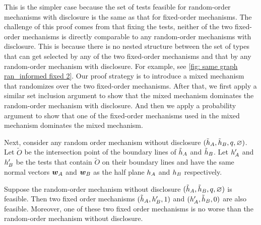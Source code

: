 This is the simpler case because the set of tests feasible for random-order mechanisms with disclosure is the same as that for fixed-order mechanisms.
The challenge of this proof comes from that fixing the tests, neither of the two fixed-order mechanisms is directly comparable to any random-order mechanisms with disclosure.
This is because there is no nested structure between the set of types that can get selected by any of the two fixed-order mechanisms and that by any random-order mechanism with disclosure.
For example, see \cref{fig: same graph ran_informed fixed 2}. 
Our proof strategy is to introduce a mixed mechanism that randomizes over the two fixed-order mechanisms.
After that, we first apply a similar set inclusion argument to show that the mixed  mechanism dominates the random-order mechanism with disclosure.
And then we apply a probability argument to show that one of the fixed-order mechanisms used in the mixed mechanism dominates the mixed mechanism.





Next, consider any random order mechanism without disclosure $(\tilde {h}_A,\tilde {h}_B, q, \varnothing)$. 
Let $\tilde O$ be the intersection point of the boundary lines of $ \tilde{h}_A$ and $\tilde {h}_B$. Let $h_A'$ and $h_B'$ be the tests that contain $\tilde O$ on their boundary lines and have the same normal vectors $\boldsymbol{w}_A$ and $\boldsymbol{w}_B$ as the half plane $h_A$ and $h_B$ respectively. 

\begin{lemma}\label{lem:feasible-uninformed-rand-distance cost}
 Suppose the random-order mechanism  without disclosure $(\tilde{h}_A,\tilde{h}_B,q,\varnothing)$ is feasible.  
 Then two fixed order mechanisms $(\tilde{h}_A,h_B',1)$ and $(h_A',\tilde{h}_B,0)$ are also feasible.
 Moreover, one of these two fixed order mechanisms is no worse than the random-order mechanism without disclosure.
\end{lemma}

